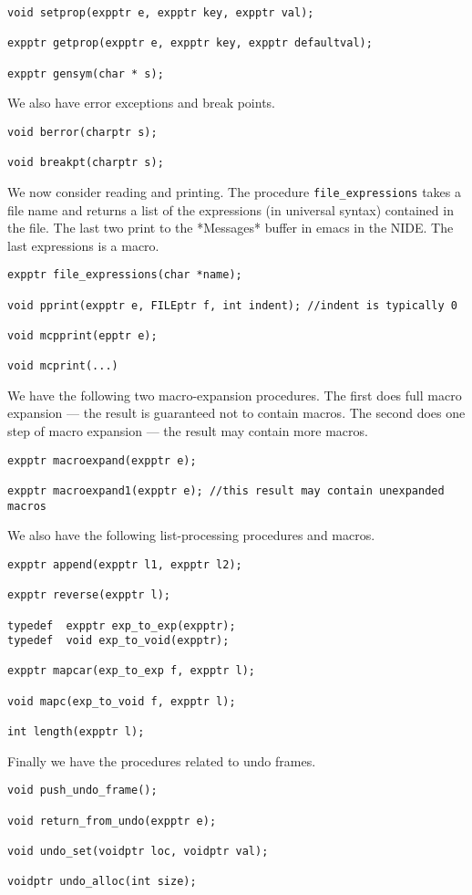 \documentclass{article}
\begin{document}
\begin{verbatim}
void setprop(expptr e, expptr key, expptr val);

expptr getprop(expptr e, expptr key, expptr defaultval);

expptr gensym(char * s);
\end{verbatim}

We also have error exceptions and break points.

\begin{verbatim}
void berror(charptr s);

void breakpt(charptr s);
\end{verbatim}

We now consider reading and printing.  The procedure {\tt file\_expressions} takes a file name and returns a list of the expressions
(in universal syntax) contained in the file.  The last two print to the *Messages* buffer in emacs in the NIDE.
The last expressions is a macro.

\begin{verbatim}
expptr file_expressions(char *name);

void pprint(expptr e, FILEptr f, int indent); //indent is typically 0

void mcpprint(epptr e);

void mcprint(...)
\end{verbatim}

We have the following two macro-expansion procedures.  The first does full macro expansion --- the result is guaranteed not to contain macros.
The second does one step of macro expansion --- the result may contain more macros.

\begin{verbatim}
expptr macroexpand(expptr e);

expptr macroexpand1(expptr e); //this result may contain unexpanded macros
\end{verbatim}

We also have the following list-processing procedures and macros.

\begin{verbatim}
expptr append(expptr l1, expptr l2);

expptr reverse(expptr l);

typedef  expptr exp_to_exp(expptr);
typedef  void exp_to_void(expptr);

expptr mapcar(exp_to_exp f, expptr l);

void mapc(exp_to_void f, expptr l);

int length(expptr l);
\end{verbatim}

Finally we have the procedures related to undo frames.

\begin{verbatim}
void push_undo_frame();

void return_from_undo(expptr e);

void undo_set(voidptr loc, voidptr val);

voidptr undo_alloc(int size);
\end{verbatim}




\end{document}
